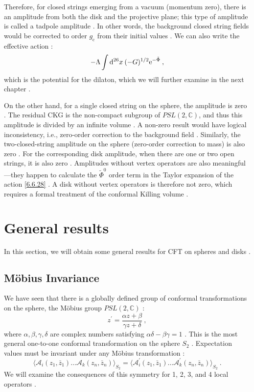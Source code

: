 Therefore, for closed strings emerging from a vacuum (momentum zero), there is an amplitude from both the disk and the projective plane; this type of amplitude is called a tadpole amplitude . In other words, the background closed string fields would be corrected to order $g_{\mathrm{c}}$ from their initial values . We can also write the effective action :
\begin{equation}
	-\Lambda \int \mathrm{d}^{26} x \: (-G)^{1/2} \mathrm{e}^{-\tilde{\Phi}} \:, \label{6.6.28}
\end{equation}
which is the potential for the dilaton, which we will further examine in the next chapter .

On the other hand, for a single closed string on the sphere, the amplitude is zero . The residual CKG is the non-compact subgroup of $PSL(2, \mathds{C})$, and thus this amplitude is divided by an infinite volume . A non-zero result would have logical inconsistency, i.e., zero-order correction to the background field . Similarly, the two-closed-string amplitude on the sphere (zero-order correction to mass) is also zero . For the corresponding disk amplitude, when there are one or two open strings, it is also zero . Amplitudes without vertex operators are also meaningful—they happen to calculate the $\tilde{\Phi}^{0}$ order term in the Taylor expansion of the action \eqref{6.6.28} . A disk without vertex operators is therefore not zero, which requires a formal treatment of the conformal Killing volume .

\section{General results}  \label{sec:6.7} 

In this section, we will obtain some general results for CFT on spheres and disks .

\subsection*{Möbius Invariance}
We have seen that there is a globally defined group of conformal transformations on the sphere, the Möbius group $PSL(2, \mathds{C})$ :
\begin{equation}
	z^{\prime}=\frac{\alpha z+\beta}{\gamma z+\delta} \:, \label{6.7.1}
\end{equation}
where $\alpha, \beta, \gamma, \delta$ are complex numbers satisfying $\alpha \delta-\beta \gamma=1$ . This is the most general one-to-one conformal transformation on the sphere $S_2$ . Expectation values must be invariant under any Möbius transformation :
\begin{equation}
	\bigl\langle\mathscr{A}_{i}(z_{1}, \bar{z}_{1}) \ldots \mathscr{A}_{k}(z_{n}, \bar{z}_{n})\bigr\rangle_{S_{2}} =
	\bigl\langle\mathscr{A}_{i}^{\prime}(z_{1}, \bar{z}_{1}) \ldots \mathscr{A}_{k}^{\prime}(z_{n}, \bar{z}_{n})\bigr\rangle_{S_{2}} \:. \label{6.7.2}
\end{equation}
We will examine the consequences of this symmetry for 1, 2, 3, and 4 local operators .

